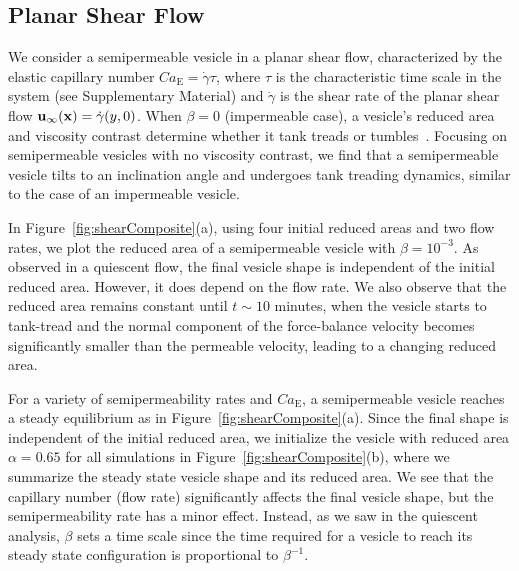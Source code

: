 \documentclass[9pt,twocolumn,twoside,lineno]{pnas-new}
\begin{document}
\subsection*{Planar Shear Flow}

We consider a semipermeable vesicle in a planar shear flow, characterized by the elastic capillary number
$Ca_\mathrm{E}=\dot{\gamma}\tau$, where $\tau$ is the characteristic time scale in the system (see Supplementary Material) and
$\dot{\gamma}$ is the shear rate of the planar shear flow
$\mathbf{u}_{\infty}(\mathbf{x}) = \dot{\gamma} (y,0)$.
 When $\beta=0$ (impermeable
case), a vesicle's reduced area and viscosity contrast determine whether
it tank treads or tumbles~\cite{fin-lam-sei-gom2008,
kra-win-sei-lip1996}. Focusing on semipermeable vesicles with no
viscosity contrast, we find that a semipermeable vesicle tilts to an
inclination angle and undergoes tank treading dynamics, similar to the
case of an impermeable vesicle.

In Figure~\ref{fig:shearComposite}(a), using four initial reduced areas
and two flow rates, we plot the reduced area of a semipermeable vesicle
with $\beta = 10^{-3}$. As observed in a quiescent flow, the final
vesicle shape is independent of the initial reduced area. However, it
does depend on the flow rate. We also observe that the reduced area
remains constant until $t\sim 10$ minutes, when the vesicle starts to
tank-tread and the normal component of the force-balance velocity
becomes significantly smaller than the permeable velocity, leading to a
changing reduced area.

For a variety of semipermeability rates and $Ca_\mathrm{E}$, a semipermeable
vesicle reaches a steady equilibrium as in
Figure~\ref{fig:shearComposite}(a). Since the final shape is independent
of the initial reduced area, we initialize the vesicle with reduced area
$\alpha = 0.65$ for all simulations in
Figure~\ref{fig:shearComposite}(b), where we summarize the steady state
vesicle shape and its reduced area. We see that the capillary number (flow rate)
significantly affects the final vesicle shape, but the semipermeability
rate has a minor effect. Instead, as we saw in the quiescent analysis,
$\beta$ sets a time scale since the time required for a vesicle to reach
its steady state configuration is proportional to $\beta^{-1}$.

\end{document}
